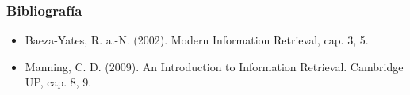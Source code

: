 \documentclass[
10pt, %
aspectratio=169, %
]{beamer}
\begin{document}
	\begin{frame}
		
		\frametitle{Bibliografía}
		
		\begin{itemize}
			\item Baeza-Yates, R. a.-N. (2002). Modern Information Retrieval, cap. 3, 5.
			\item Manning, C. D. (2009). An Introduction to Information Retrieval. Cambridge UP, cap. 8, 9.
		\end{itemize}
		
	\end{frame}
	
	\begin{frame}
		\titlepage
	\end{frame}
	
	
	
\end{document}
